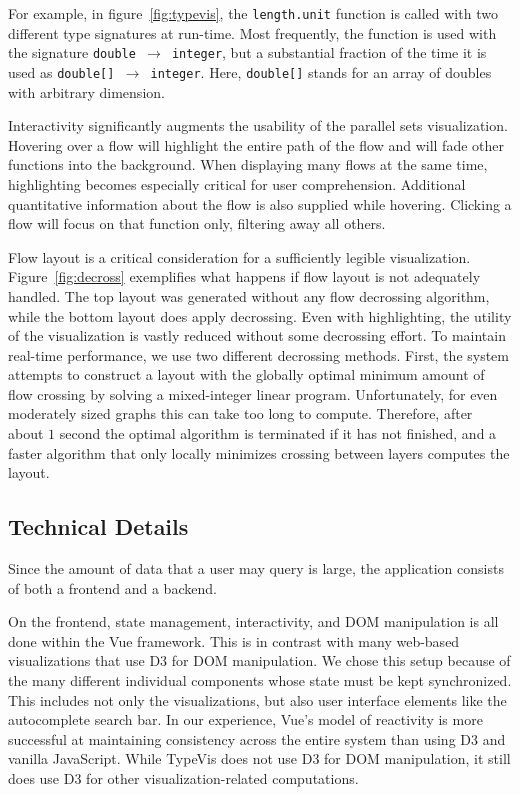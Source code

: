 \documentclass{vgtc}                          %
\newcommand{\typevis}{{\sc TypeVis}\xspace}
\begin{document}
For example, in figure~\ref{fig:typevis},
the {\tt length.unit} function is called with
two different type signatures at run-time.
Most frequently, the function is used with the
signature {\tt double $\to$ integer},
but a substantial fraction of the time it is
used as {\tt double[] $\to$ integer}.
Here, {\tt double[]} stands for an array of
doubles with arbitrary dimension.

Interactivity significantly augments the
usability of the parallel sets visualization.
Hovering over a flow will highlight the
entire path of the flow
and will fade other functions
into the background.
When displaying many flows at the same time,
highlighting becomes especially critical
for user comprehension.
Additional quantitative information
about the flow is also supplied
while hovering.
Clicking a flow will focus on that function
only, filtering away all others.

Flow layout is a critical consideration
for a sufficiently legible visualization.
Figure~\ref{fig:decross} exemplifies what
happens if flow layout is not adequately handled.
The top layout was generated without any
flow decrossing algorithm,
while the bottom layout does
apply decrossing.
Even with highlighting,
the utility of the visualization is vastly
reduced without some decrossing effort.
To maintain real-time performance,
we use two different decrossing methods.
First, the system attempts to construct
a layout with the globally optimal
minimum amount of flow crossing by
solving a mixed-integer linear program.
Unfortunately, for even moderately
sized graphs this can take too long to compute.
Therefore, after about $1$ second
the optimal algorithm is terminated
if it has not finished, and a faster
algorithm that only locally minimizes crossing
between layers computes the layout.

\subsection{Technical Details}

Since the amount of data that a user may query is large,
the application consists of both a frontend and a backend.

On the frontend, state management, interactivity,
and DOM manipulation is all done within the Vue framework.
This is in contrast with many web-based visualizations
that use D3 for DOM manipulation.
We chose this setup because of the many different
individual components whose state must be kept
synchronized.
This includes not only the visualizations, but also
user interface elements like the autocomplete search bar.
In our experience, Vue's model of reactivity is
more successful at maintaining consistency across the
entire system than using D3 and vanilla JavaScript.
While \typevis does not use D3 for DOM manipulation,
it still does use D3 for other visualization-related
computations.
\end{document}
